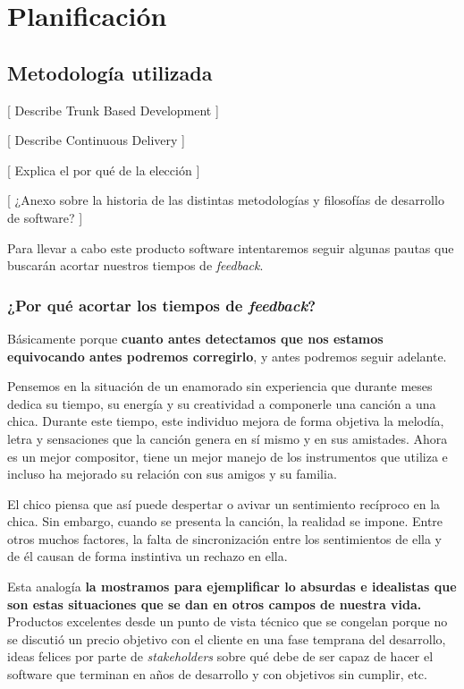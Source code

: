 \chapter{Planificación}

\section{Metodología utilizada}

[ Describe Trunk Based Development ]

[ Describe Continuous Delivery ]

[ Explica el por qué de la elección ]

[ ¿Anexo sobre la historia de las distintas metodologías y
filosofías de desarrollo de software? ]

Para llevar a cabo este producto software intentaremos seguir algunas
pautas que buscarán acortar nuestros tiempos de \textit{feedback}.

\subsection{¿Por qué acortar los tiempos de \textit{feedback}?}

Básicamente porque \textbf{cuanto antes detectamos que nos estamos equivocando
antes podremos corregirlo}, y antes podremos seguir adelante.

Pensemos en la situación de un enamorado sin experiencia que durante meses dedica su
tiempo, su energía y su creatividad a componerle una canción a una chica.
Durante este tiempo, este individuo mejora de forma objetiva la
melodía, letra y sensaciones que la canción genera en sí mismo
y en sus amistades. Ahora es un mejor compositor, tiene un mejor manejo
de los instrumentos que utiliza e incluso ha mejorado su
relación con sus amigos y su familia.

El chico piensa que así puede despertar o avivar un sentimiento recíproco
en la chica. Sin embargo, cuando se presenta la canción,
la realidad se impone. Entre otros muchos factores,
la falta de sincronización entre los sentimientos de ella y de él causan
de forma instintiva un rechazo en ella.

Esta analogía \textbf{la mostramos para ejemplificar lo absurdas e idealistas
que son estas situaciones que se dan en otros campos de nuestra vida.}
Productos excelentes desde un punto de vista técnico que se
congelan porque no se discutió un precio objetivo con
el cliente en una fase temprana del desarrollo, ideas felices
por parte de \textit{stakeholders} sobre qué debe de
ser capaz de hacer el software que terminan en años de desarrollo
y con objetivos sin cumplir, etc.

